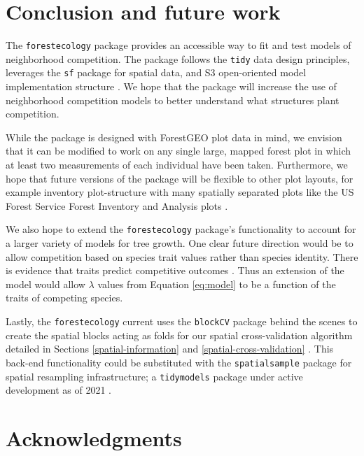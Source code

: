 \documentclass[12pt]{article}
\begin{document}
\hypertarget{conclusion-and-future-work}{%
\section{Conclusion and future work}\label{conclusion-and-future-work}}

The \texttt{forestecology} package provides an accessible way to fit and
test models of neighborhood competition. The package follows the
\texttt{tidy} data design principles, leverages the \texttt{sf} package
for spatial data, and S3 open-oriented model implementation structure
\citep{pebesma_simple_2018}. We hope that the package will increase the
use of neighborhood competition models to better understand what
structures plant competition.

While the package is designed with ForestGEO plot data in mind, we
envision that it can be modified to work on any single large, mapped
forest plot in which at least two measurements of each individual have
been taken. Furthermore, we hope that future versions of the package
will be flexible to other plot layouts, for example inventory
plot-structure with many spatially separated plots like the US Forest
Service Forest Inventory and Analysis plots \citep{smith_forest_2002}.

We also hope to extend the \texttt{forestecology} package's
functionality to account for a larger variety of models for tree growth.
One clear future direction would be to allow competition based on
species trait values rather than species identity. There is evidence
that traits predict competitive outcomes
\citep[\citet{lasky_trait-mediated_2014},
\citet{uriarte_trait_2010}]{kunstler_competitive_2012}. Thus an
extension of the model would allow \(\lambda\) values from Equation
\ref{eq:model} to be a function of the traits of competing species.

Lastly, the \texttt{forestecology} current uses the \texttt{blockCV}
package behind the scenes to create the spatial blocks acting as folds
for our spatial cross-validation algorithm detailed in Sections
\ref{spatial-information} and \ref{spatial-cross-validation}
\citep{valavi_blockcv_2019}. This back-end functionality could be
substituted with the \texttt{spatialsample} package for spatial
resampling infrastructure; a \texttt{tidymodels} package under active
development as of 2021
\citep[\citet{tidymodels_package}]{spatialsample_package}.

\hypertarget{acknowledgments}{%
\section{Acknowledgments}\label{acknowledgments}}
\end{document}
